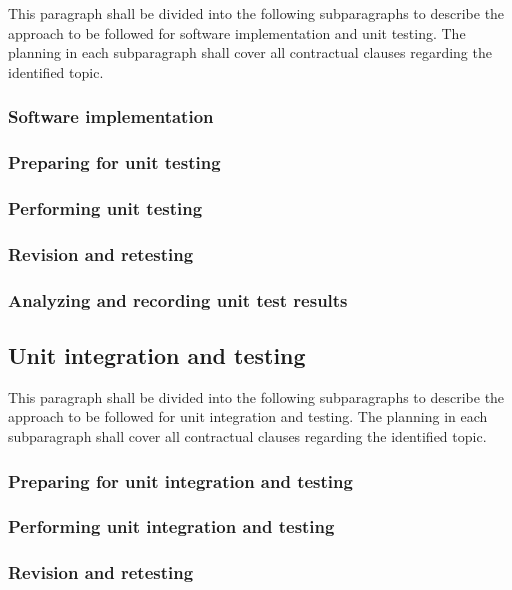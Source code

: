 This paragraph shall be divided into the following subparagraphs to
describe the approach to be followed for software implementation and
unit testing. The planning in each subparagraph shall cover all
contractual clauses regarding the identified topic.

\subsubsection{Software implementation}

\subsubsection{Preparing for unit testing}

\subsubsection{Performing unit testing}

\subsubsection{Revision and retesting}

\subsubsection{Analyzing and recording unit test results}

\subsection{Unit integration and testing}

This paragraph shall be divided into the following subparagraphs to
describe the approach to be followed for unit integration and testing.
The planning in each subparagraph shall cover all contractual clauses
regarding the identified topic.

\subsubsection{Preparing for unit integration and testing}

\subsubsection{Performing unit integration and testing}

\subsubsection{Revision and retesting}

